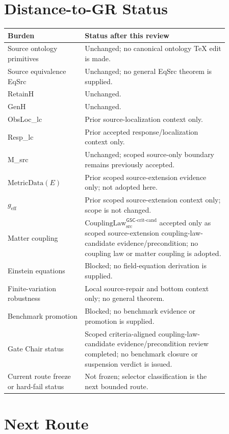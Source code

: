 \documentclass[11pt]{article}
\newcommand{\geff}{g_{\mathrm{eff}}}
\newcommand{\CouplingLawCrit}{\mathrm{CouplingLaw}^{\mathsf{GSC}\mbox{-}\mathrm{crit}\mbox{-}\mathrm{cand}}_{\mathrm{src}}}
\newcommand{\MetricData}{\mathrm{MetricData}}
\begin{document}
\section{Distance-to-GR Status}

\begin{longtable}{p{0.30\linewidth}p{0.56\linewidth}}
\toprule
Burden & Status after this review \\
\midrule
Source ontology primitives & Unchanged; no canonical ontology TeX edit is made. \\
Source equivalence EqSrc & Unchanged; no general EqSrc theorem is supplied. \\
RetainH & Unchanged. \\
GenH & Unchanged. \\
ObsLoc\_lc & Prior source-localization context only. \\
Resp\_lc & Prior accepted response/localization context only. \\
M\_src & Unchanged; scoped source-only boundary remains previously accepted. \\
\(\MetricData(E)\) & Prior scoped source-extension evidence only; not adopted here. \\
\(\geff\) & Prior scoped source-extension context only; scope is not changed. \\
Matter coupling & \(\CouplingLawCrit\) accepted only as scoped source-extension coupling-law-candidate evidence/precondition; no coupling law or matter coupling is adopted. \\
Einstein equations & Blocked; no field-equation derivation is supplied. \\
Finite-variation robustness & Local source-repair and bottom context only; no general theorem. \\
Benchmark promotion & Blocked; no benchmark evidence or promotion is supplied. \\
Gate Chair status & Scoped criteria-aligned coupling-law-candidate evidence/precondition review completed; no benchmark closure or suspension verdict is issued. \\
Current route freeze or hard-fail status & Not frozen; selector classification is the next bounded route. \\
\bottomrule
\end{longtable}

\section{Next Route}
\end{document}
